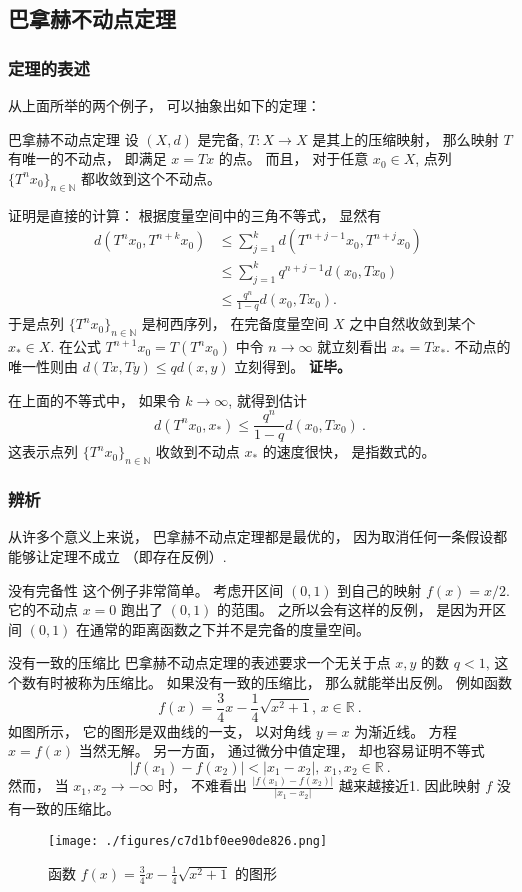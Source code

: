 \subsection{巴拿赫不动点定理}
\subsubsection{定理的表述}
从上面所举的两个例子， 可以抽象出如下的定理：
\begin{theorem}{巴拿赫不动点定理}\label{the_ConMap_1}
设 $(X,d)$ 是完备, $T:X\to X$ 是其上的压缩映射， 那么映射 $T$ 有唯一的不动点， 即满足 $x=Tx$ 的点。 而且， 对于任意 $x_0\in X$, 点列 $\{T^nx_0\}_{n\in\mathbb{N}}$ 都收敛到这个不动点。
\end{theorem}
证明是直接的计算： 根据度量空间中的三角不等式， 显然有
$$
\begin{aligned}
d(T^nx_0,T^{n+k}x_0)
&\leq \sum_{j=1}^k d(T^{n+j-1}x_0,T^{n+j}x_0)\\
&\leq \sum_{j=1}^k q^{n+j-1}d(x_0,Tx_0)\\
&\leq \frac{q^n}{1-q}d(x_0,Tx_0).
\end{aligned}~
$$
于是点列 $\{T^nx_0\}_{n\in\mathbb{N}}$ 是柯西序列， 在完备度量空间 $X$ 之中自然收敛到某个 $x_*\in X$. 在公式 $T^{n+1}x_0=T(T^nx_0)$ 中令 $n\to\infty$ 就立刻看出 $x_*=Tx_*$. 不动点的唯一性则由 $d(Tx,Ty)\leq qd(x,y)$ 立刻得到。 \textbf{证毕。}

在上面的不等式中， 如果令 $k\to\infty$, 就得到估计
$$
d(T^nx_0,x_*)\leq\frac{q^n}{1-q}d(x_0,Tx_0)~.
$$
这表示点列 $\{T^nx_0\}_{n\in\mathbb{N}}$ 收敛到不动点 $x_*$ 的速度很快， 是指数式的。

\subsubsection{辨析}
从许多个意义上来说， 巴拿赫不动点定理都是最优的， 因为取消任何一条假设都能够让定理不成立 （即存在反例）.

\begin{example}{没有完备性}
这个例子非常简单。 考虑开区间 $(0,1)$ 到自己的映射 $f(x)=x/2$. 它的不动点 $x=0$ 跑出了 $(0,1)$ 的范围。 之所以会有这样的反例， 是因为开区间 $(0,1)$ 在通常的距离函数之下并不是完备的度量空间。
\end{example}

\begin{example}{没有一致的压缩比}
巴拿赫不动点定理的表述要求一个无关于点 $x,y$ 的数 $q<1$, 这个数有时被称为压缩比。 如果没有一致的压缩比， 那么就能举出反例。 例如函数
$$
f(x)=\frac{3}{4}x-\frac{1}{4}\sqrt{x^2+1},\,x\in\mathbb{R}~.
$$
如图所示， 它的图形是双曲线的一支， 以对角线 $y=x$ 为渐近线。 方程 $x=f(x)$ 当然无解。 另一方面， 通过微分中值定理， 却也容易证明不等式
$$
|f(x_1)-f(x_2)|<|x_1-x_2|,\,x_1,x_2\in\mathbb{R}~.
$$
然而， 当 $x_1,x_2\to-\infty$ 时， 不难看出 $\frac{|f(x_1)-f(x_2)|}{|x_1-x_2|}$ 越来越接近1. 因此映射 $f$ 没有一致的压缩比。 
\begin{figure}[ht]
\centering
\texttt{[image: ./figures/c7d1bf0ee90de826.png]}
\caption{函数 $f(x)=\frac{3}{4}x-\frac{1}{4}\sqrt{x^2+1}$ 的图形} \label{fig_ConMap_2}
\end{figure}

\end{example}

